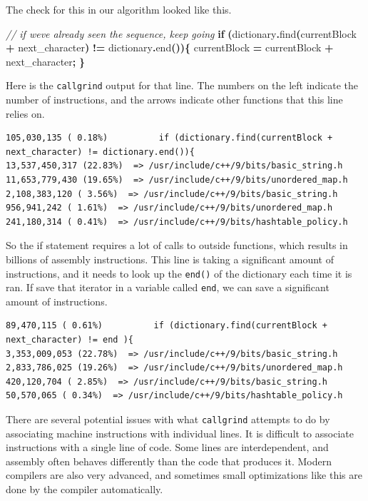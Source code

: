 \documentclass[12pt,twoside]{reedthesis}
\newenvironment{Shaded}{\begin{snugshade}}{\end{snugshade}}
\newcommand{\CommentTok}[1]{\textcolor[rgb]{0.56,0.35,0.01}{\textit{#1}}}
\newcommand{\ControlFlowTok}[1]{\textcolor[rgb]{0.13,0.29,0.53}{\textbf{#1}}}
\newcommand{\NormalTok}[1]{#1}
\newcommand{\OperatorTok}[1]{\textcolor[rgb]{0.81,0.36,0.00}{\textbf{#1}}}
\begin{document}
The check for this in our algorithm looked like this.
\begin{Shaded}
\begin{Highlighting}[]
\CommentTok{// if we\textquotesingle{}ve already seen the sequence, keep going}
\ControlFlowTok{if} \OperatorTok{(}\NormalTok{dictionary}\OperatorTok{.}\NormalTok{find}\OperatorTok{(}\NormalTok{currentBlock }\OperatorTok{+}\NormalTok{ next\_character}\OperatorTok{)} \OperatorTok{!=}\NormalTok{ dictionary}\OperatorTok{.}\NormalTok{end}\OperatorTok{())\{}
\NormalTok{    currentBlock }\OperatorTok{=}\NormalTok{ currentBlock }\OperatorTok{+}\NormalTok{ next\_character}\OperatorTok{;}
\OperatorTok{\}}
\end{Highlighting}
\end{Shaded}
Here is the \texttt{callgrind} output for that line. The numbers on the left indicate the number of instructions, and the arrows indicate other functions that this line relies on.
\begin{verbatim}
105,030,135 ( 0.18%)          if (dictionary.find(currentBlock + next_character) != dictionary.end()){
13,537,450,317 (22.83%)  => /usr/include/c++/9/bits/basic_string.h
11,653,779,430 (19.65%)  => /usr/include/c++/9/bits/unordered_map.h
2,108,383,120 ( 3.56%)  => /usr/include/c++/9/bits/basic_string.h
956,941,242 ( 1.61%)  => /usr/include/c++/9/bits/unordered_map.h
241,180,314 ( 0.41%)  => /usr/include/c++/9/bits/hashtable_policy.h
\end{verbatim}
So the if statement requires a lot of calls to outside functions, which results in billions of assembly instructions. This line is taking a significant amount of instructions, and it needs to look up the \texttt{end()} of the dictionary each time it is ran. If save that iterator in a variable called \texttt{end}, we can save a significant amount of instructions.
\begin{verbatim}
89,470,115 ( 0.61%)          if (dictionary.find(currentBlock + next_character) != end ){
3,353,009,053 (22.78%)  => /usr/include/c++/9/bits/basic_string.h
2,833,786,025 (19.26%)  => /usr/include/c++/9/bits/unordered_map.h
420,120,704 ( 2.85%)  => /usr/include/c++/9/bits/basic_string.h
50,570,065 ( 0.34%)  => /usr/include/c++/9/bits/hashtable_policy.h
\end{verbatim}
There are several potential issues with what \texttt{callgrind} attempts to do by associating machine instructions with individual lines. It is difficult to associate instructions with a single line of code. Some lines are interdependent, and assembly often behaves differently than the code that produces it. Modern compilers are also very advanced, and sometimes small optimizations like this are done by the compiler automatically.
\end{document}
